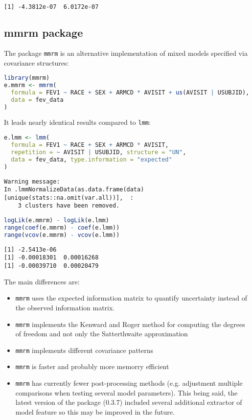 \documentclass[12pt]{article}
\begin{document}
\label{}
\begin{verbatim}
[1] -4.3812e-07  6.0172e-07
\end{verbatim}
\subsection{mmrm package}
\label{sec:org138b936}

The package \texttt{mmrm} is an alternative implementation of mixed models
specified via covariance structures:
\begin{lstlisting}[language=r,numbers=none]
library(mmrm)
e.mmrm <- mmrm(
  formula = FEV1 ~ RACE + SEX + ARMCD * AVISIT + us(AVISIT | USUBJID),
  data = fev_data
)
\end{lstlisting}

It leads nearly identical results compared to \texttt{lmm}:
\begin{lstlisting}[language=r,numbers=none]
e.lmm <- lmm(
  formula = FEV1 ~ RACE + SEX + ARMCD * AVISIT,
  repetition = ~ AVISIT | USUBJID, structure = "UN",
  data = fev_data, type.information = "expected"
)
\end{lstlisting}
\label{}
\begin{verbatim}
Warning message:
In .lmmNormalizeData(as.data.frame(data)[unique(stats::na.omit(var.all))],  :
    3 clusters have been removed.
\end{verbatim}


\begin{lstlisting}[language=r,numbers=none]
logLik(e.mmrm) - logLik(e.lmm)
range(coef(e.mmrm) - coef(e.lmm))
range(vcov(e.mmrm) - vcov(e.lmm))
\end{lstlisting}

\label{}
\begin{verbatim}
[1] -2.5413e-06
[1] -0.00018301  0.00016268
[1] -0.00039710  0.00020479
\end{verbatim}


The main differences are:
\begin{itemize}
\item \texttt{mmrm} uses the expected information matrix to quantify uncertainty
instead of the observed information matrix.
\item \texttt{mmrm} implements the Kenward and Roger method for computing the degrees of
freedom and not only the Satterthwaite approximation
\item \texttt{mmrm} implements different covariance patterns
\item \texttt{mmrm} is faster and probably more memorry efficient
\item \texttt{mmrm} has currently fewer post-processing methods (e.g. adjustment
multiple comparisons when testing several model parameters). This
being said, the latest version of the package (0.3.7) included
several additional extractor of model feature so this may be
improved in the future.
\end{itemize}
\end{document}
